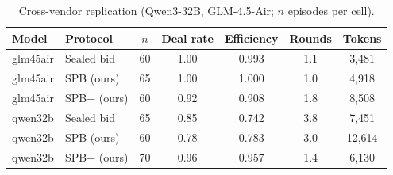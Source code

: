 \begin{table}[t]\centering
\caption{Cross-vendor replication (Qwen3-32B, GLM-4.5-Air; $n$ episodes per cell).}
\label{tab:replication}
\begin{tabular}{llccccc}\toprule
Model & Protocol & $n$ & Deal rate & Efficiency & Rounds & Tokens \\ \midrule
glm45air & Sealed bid & 60 & 1.00 & 0.993 & 1.1 & 3,481 \\
glm45air & SPB (ours) & 65 & 1.00 & 1.000 & 1.0 & 4,918 \\
glm45air & SPB+ (ours) & 60 & 0.92 & 0.908 & 1.8 & 8,508 \\
\midrule
qwen32b & Sealed bid & 65 & 0.85 & 0.742 & 3.8 & 7,451 \\
qwen32b & SPB (ours) & 60 & 0.78 & 0.783 & 3.0 & 12,614 \\
qwen32b & SPB+ (ours) & 70 & 0.96 & 0.957 & 1.4 & 6,130 \\
\bottomrule\end{tabular}\end{table}